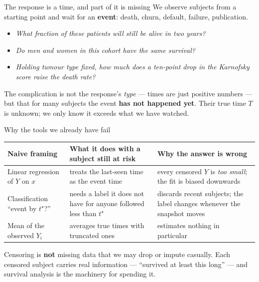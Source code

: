 \documentclass[aspectratio=169,11pt]{beamer}
\begin{document}
\begin{frame}{The response is a time, and part of it is missing}
  We observe subjects from a starting point and wait for an \textbf{event}: death,
  churn, default, failure, publication.
  \begin{readme}
    \begin{itemize}
      \item \emph{What fraction of these patients will still be alive in two years?}
      \item \emph{Do men and women in this cohort have the same survival?}
      \item \emph{Holding tumour type fixed, how much does a ten-point drop in the
            Karnofsky score raise the death rate?}
    \end{itemize}
  \end{readme}
  \begin{takeaway}
    The complication is not the response's \emph{type} --- times are just positive
    numbers --- but that for many subjects the event \textbf{has not happened yet}.
    Their true time $T$ is unknown; we only know it exceeds what we have watched.
  \end{takeaway}
\end{frame}

\begin{frame}{Why the tools we already have fail}
  \begin{center}\footnotesize
  \begin{tabular}{@{}p{3.5cm}p{4.1cm}p{4.7cm}@{}}
    \toprule
    \textbf{Naive framing} & \textbf{What it does with a subject still at risk} &
    \textbf{Why the answer is wrong} \\
    \midrule
    Linear regression of $Y$ on $x$ & treats the last-seen time as the event time &
    every censored $Y$ is \emph{too small}; the fit is biased downwards \\
    Classification ``event by $t^\star$?'' & needs a label it does not have for
    anyone followed less than $t^\star$ & discards recent subjects; the label
    changes whenever the snapshot moves \\
    Mean of the observed $Y_i$ & averages true times with truncated ones &
    estimates nothing in particular \\
    \bottomrule
  \end{tabular}
  \end{center}
  \begin{takeaway}
    Censoring is \textbf{not} missing data that we may drop or impute casually.
    Each censored subject carries real information --- ``survived at least this
    long'' --- and survival analysis is the machinery for spending it.
  \end{takeaway}
\end{frame}
\end{document}
